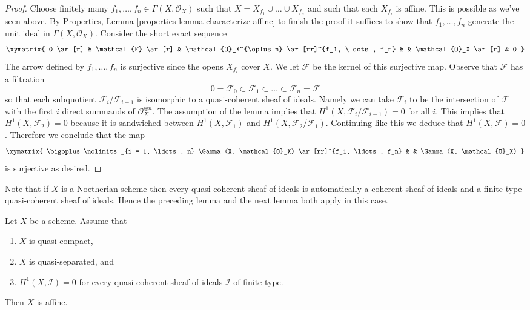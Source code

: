\begin{proof}
\medskip\noindent
Choose finitely many $f_1, \ldots, f_n \in \Gamma(X, \mathcal{O}_X)$
such that $X = X_{f_1} \cup \ldots \cup X_{f_n}$ and such that each
$X_{f_i}$ is affine. This is possible as we've seen above.
By Properties, Lemma \ref{properties-lemma-characterize-affine}
to finish the proof it suffices
to show that $f_1, \ldots, f_n$ generate the unit ideal in
$\Gamma(X, \mathcal{O}_X)$. Consider the short exact sequence
$$
\xymatrix{
0 \ar[r] &
\mathcal{F} \ar[r] &
\mathcal{O}_X^{\oplus n} \ar[rr]^{f_1, \ldots, f_n} & &
\mathcal{O}_X \ar[r] &
0
}
$$
The arrow defined by $f_1, \ldots, f_n$ is surjective since the
opens $X_{f_i}$ cover $X$. We let $\mathcal{F}$ be the kernel
of this surjective map.
Observe that $\mathcal{F}$ has a filtration
$$
0 = \mathcal{F}_0 \subset \mathcal{F}_1 \subset
\ldots \subset \mathcal{F}_n = \mathcal{F}
$$
so that each subquotient $\mathcal{F}_i/\mathcal{F}_{i - 1}$ is
isomorphic to a quasi-coherent sheaf of ideals.
Namely we can take $\mathcal{F}_i$ to be the intersection of
$\mathcal{F}$ with the first $i$ direct summands of
$\mathcal{O}_X^{\oplus n}$.
The assumption
of the lemma implies that $H^1(X, \mathcal{F}_i/\mathcal{F}_{i - 1}) = 0$
for all $i$. This implies that
$H^1(X, \mathcal{F}_2) = 0$ because it is sandwiched between
$H^1(X, \mathcal{F}_1)$ and $H^1(X, \mathcal{F}_2/\mathcal{F}_1)$.
Continuing like this we deduce that $H^1(X, \mathcal{F}) = 0$.
Therefore we conclude that the map
$$
\xymatrix{
\bigoplus\nolimits_{i = 1, \ldots, n} \Gamma(X, \mathcal{O}_X)
\ar[rr]^{f_1, \ldots, f_n} & &
\Gamma(X, \mathcal{O}_X)
}
$$
is surjective as desired.
\end{proof}

\noindent
Note that if $X$ is a Noetherian scheme then every quasi-coherent
sheaf of ideals is automatically a coherent sheaf of ideals and a
finite type quasi-coherent sheaf of ideals. Hence
the preceding lemma and the next lemma both apply in this case.

\begin{lemma}
\label{lemma-quasi-separated-h1-zero-covering}
Let $X$ be a scheme. Assume that
\begin{enumerate}
\item $X$ is quasi-compact,
\item $X$ is quasi-separated, and
\item $H^1(X, \mathcal{I}) = 0$ for every quasi-coherent sheaf
of ideals $\mathcal{I}$ of finite type.
\end{enumerate}
Then $X$ is affine.
\end{lemma}

